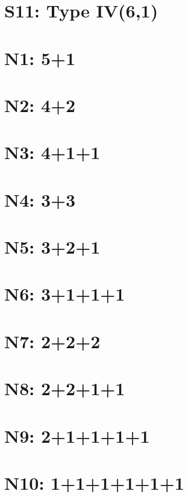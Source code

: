 \documentclass{article}
\begin{document}
\section{S11: Type IV(6,1)}

\section{N1: 5+1}

\section{N2: 4+2}

\section{N3: 4+1+1}

\section{N4: 3+3}

\section{N5: 3+2+1}

\section{N6: 3+1+1+1}

\section{N7: 2+2+2}

\section{N8: 2+2+1+1}

\section{N9: 2+1+1+1+1}

\section{N10: 1+1+1+1+1+1}
\end{document}
